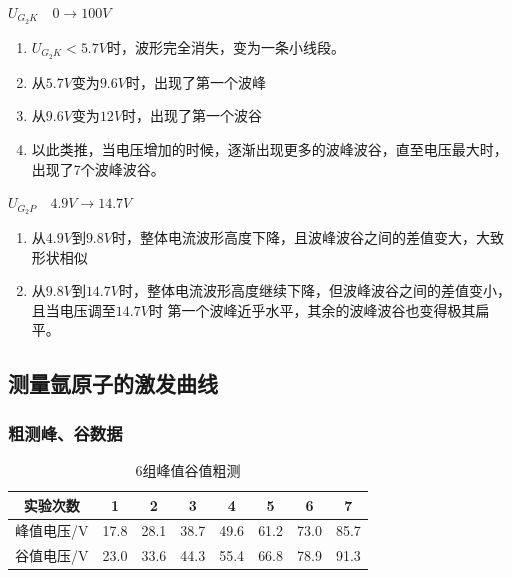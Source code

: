 \documentclass[a4paper,UTF8]{ctexart}
\begin{document}
{\uppercase\expandafter{} \bfseries $U_{G_{2}K} \quad 0 \longrightarrow 100 V$}

\begin{framed}
\begin{enumerate}
    \item $U_{G_{2}K}< 5.7V$时，波形完全消失，变为一条小线段。
    \item 从$5.7V$变为$9.6V$时，出现了第一个波峰
    \item 从$9.6V$变为$12V$时，出现了第一个波谷
    \item 以此类推，当电压增加的时候，逐渐出现更多的波峰波谷，直至电压最大时，出现了7个波峰波谷。
\end{enumerate}    
\end{framed}

{\uppercase\expandafter{} \bfseries $U_{G_{2}P} \quad 4.9V \longrightarrow 14.7V$}

\begin{framed}
    \begin{enumerate}
        \item 从$4.9V$到$9.8V$时，整体电流波形高度下降，且波峰波谷之间的差值变大，大致形状相似
        \item 从$9.8V到14.7V$时，整体电流波形高度继续下降，但波峰波谷之间的差值变小，且当电压调至$14.7V$时
        第一个波峰近乎水平，其余的波峰波谷也变得极其扁平。
    \end{enumerate}
\end{framed}

\subsection{测量氩原子的激发曲线}

\subsubsection{粗测峰、谷数据}

\begin{table}[!htp]
    \centering
    \begin{tabular}{|c|c|c|c|c|c|c|c|}
    \hline
        实验次数 & 1 & 2 & 3 & 4 & 5 & 6 & 7 \\ \hline
        峰值电压/V & 17.8 & 28.1 & 38.7 & 49.6 & 61.2 & 73.0 & 85.7  \\ \hline 
        谷值电压/V & 23.0 & 33.6 & 44.3 & 55.4 & 66.8 & 78.9 & 91.3   \\ \hline
    \end{tabular}
    \caption{6组峰值谷值粗测}
\end{table}
\end{document}

